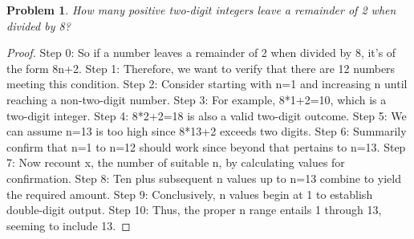 \documentclass{article}
\newtheorem{theorem}{Problem}
\begin{document}
\begin{theorem}
How many positive two-digit integers leave a remainder of 2 when divided by 8?
\end{theorem}

\begin{proof}
Step 0: So if a number leaves a remainder of 2 when divided by 8, it's of the form 8n+2.
Step 1: Therefore, we want to verify that there are 12 numbers meeting this condition.
Step 2: Consider starting with n=1 and increasing n until reaching a non-two-digit number.
Step 3: For example, 8*1+2=10, which is a two-digit integer.
Step 4: 8*2+2=18 is also a valid two-digit outcome.
Step 5: We can assume n=13 is too high since 8*13+2 exceeds two digits.
Step 6: Summarily confirm that n=1 to n=12 should work since beyond that pertains to n=13.
Step 7: Now recount x, the number of suitable n, by calculating values for confirmation.
Step 8: Ten plus subsequent n values up to n=13 combine to yield the required amount.
Step 9: Conclusively, n values begin at 1 to establish double-digit output.
Step 10: Thus, the proper n range entails 1 through 13, seeming to include 13.
\end{proof}
\end{document}

